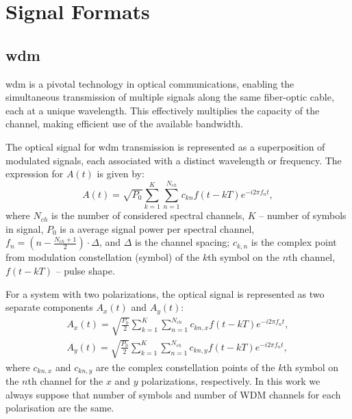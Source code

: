 





\section{Signal Formats}
\label{sec:signals}

\subsection{\acrlong{wdm}}
\acrfull{wdm} is a pivotal technology in optical communications, enabling the simultaneous transmission of multiple signals along the same fiber-optic cable, each at a unique wavelength. This effectively multiplies the capacity of the channel, making efficient use of the available bandwidth.

The optical signal  for \Gls{wdm} transmission is represented as a superposition of modulated signals, each associated with a distinct wavelength or frequency. The expression for 
$A(t)$ is given by:
\begin{equation}
A(t)=\sqrt{P_0} \sum_{k=1}^K \sum_{n=1}^{N_{ch}}  c_{kn}   f(t-kT)  e^{-i 2 \pi f_n t},
\label{eq:wdm_nlse}
\end{equation}
where $N_{ch}$ is the number of considered spectral channels, $K$ -- number of symbols in signal, $P_0$ is a average signal power per spectral channel, $f_n=\left(n - \frac{N_{ch}+1}{2}\right) \cdot \Delta$, and $\Delta$ is the channel spacing; $c_{k,n}$ is the complex point from modulation constellation (symbol) of the $k$th symbol on the $n$th channel, $f(t-kT)$ -- pulse shape.

For a system with two polarizations, the optical signal is represented as two separate components $A_x(t)$ and $A_y(t)$:
\begin{eqnarray}
A_x(t)=\sqrt{\frac{P_0}{2}} \sum_{k=1}^K \sum_{n=1}^{N_{ch}}  c_{kn,x} f(t-kT)  e^{-i 2 \pi f_n t}, \nonumber \\
A_y(t)=\sqrt{\frac{P_0}{2}} \sum_{k=1}^K \sum_{n=1}^{N_{ch}}  c_{kn,y} f(t-kT)  e^{-i 2 \pi f_n t}, 
\label{eq:wdm_manakov}
\end{eqnarray}
where $c_{kn,x}$ and $c_{kn,y}$ are the complex constellation points of the 
$k$th symbol on the 
$n$th channel for the $x$ and $y$ polarizations, respectively.
In this work we always suppose that number of symbols and number of WDM channels for each polarisation are the same. 


